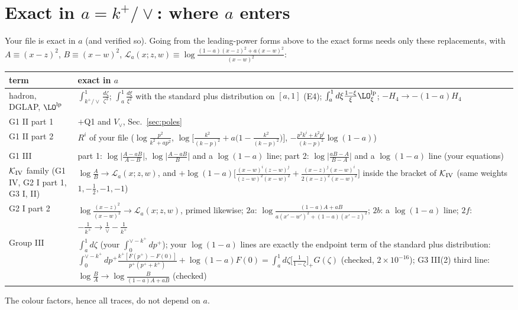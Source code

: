
\appendix
\section{Exact in \texorpdfstring{$a=k^+/\vee$}{a=k+/vee}: where \texorpdfstring{$a$}{a} enters}\label{sec:exact}
Your file is exact in $a$ (and verified so). Going from the leading-power forms above to the exact forms needs only these replacements, with $A\equiv(x-z)^2$, $B\equiv(x-w)^2$, $\mathcal L_a(x;z,w)\equiv\log\frac{(1-a)(x-z)^2+a(x-w)^2}{(x-w)^2}$:
\begin{center}\small
\begin{tabular}{@{}p{}p{}@{}}\toprule
term & exact in $a$\\\midrule
hadron, DGLAP, $\LO^{\rm lp}$ & $\int_{k^+/\vee}^1\frac{d\zeta}{\zeta^3}$; $\int_a^1\frac{d\xi}{\xi^2}$ with the standard plus distribution on $[a,1]$ (E4); $\int_a^1d\xi\frac{1-\xi}{\xi}\LO^{\rm lp}_\xi$; $-H_4\to-(1-a)H_4$\\
G1 II part 1 & $+$Q1 and $V_\vee$, Sec.~\ref{sec:poles}\\
G1 II part 2 & $R^i$ of your file ($\log\frac{p^2}{k^2+ap^2}$, $\log\big[\frac{k^2}{(k-p)^2}+a\big(1-\frac{k^2}{(k-p)^2}\big)\big]$, $-\frac{p^2k^i+k^2p^i}{(k-p)^2}\log(1-a)$)\\
G1 III & part 1: $\log\big|\frac{A-aB}{A-B}\big|$, $\log\big|\frac{A-aB}{B}\big|$ and a $\log(1-a)$ line; part 2: $\log\big|\frac{aB-A}{B-A}\big|$ and a $\log(1-a)$ line (your equations)\\
$\mathcal K_{\rm IV}$ family (G1 IV, G2 I part 1, G3 I, II) & $\log\frac{A}{B}\to\mathcal L_a(x;z,w)$, and $+\log(1-a)\Big[\frac{(x-w)^{i}(z-w)^{j}}{(z-w)^{2}(x-w)^{2}}+\frac{(x-z)^{j}(x-w)^{i}}{2(x-z)^{2}(x-w)^{2}}\Big]$ inside the bracket of $\mathcal K_{\rm IV}$ (same weights $1,-\frac12,-1,-1$)\\
G2 I part 2 & $\log\frac{(x-z)^2}{(x-w)^2}\to\mathcal L_a(x;z,w)$, primed likewise; $2a$: $\log\frac{(1-a)A+aB}{a(x'-w')^2+(1-a)(x'-z)^2}$; $2b$: a $\log(1-a)$ line; $2f$: $-\frac1{k^+}\to\frac1\vee-\frac1{k^+}$\\
Group III & $\int_a^1d\zeta$ (your $\int_0^{\vee-k^+}dp^+$); your $\log(1-a)$ lines are exactly the endpoint term of the standard plus distribution: $\int_0^{\vee-k^+}\!dp^+\frac{k^+[F(p^+)-F(0)]}{p^+(p^++k^+)}+\log(1-a)F(0)=\int_a^1d\zeta\big[\frac1{1-\zeta}\big]_+G(\zeta)$ (checked, $2\times10^{-16}$); G3 III(2) third line: $\log\frac BA\to\log\frac{B}{(1-a)A+aB}$ (checked)\\\bottomrule
\end{tabular}
\end{center}
The colour factors, hence all traces, do not depend on $a$.

